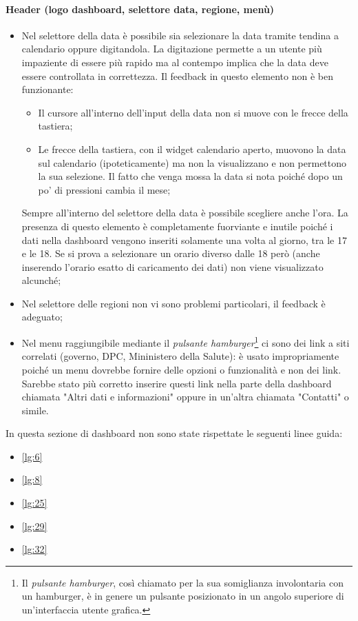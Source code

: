 \paragraph{Header (logo dashboard, selettore data, regione, menù)}
\begin{itemize}
    \item Nel selettore della data è possibile sia selezionare la data tramite tendina a calendario oppure digitandola. La digitazione permette a un utente più impaziente di essere più rapido ma al contempo implica che la data deve essere controllata in correttezza. Il feedback in questo elemento non è ben funzionante:
    \begin{itemize}
        \item Il cursore all'interno dell'input della data non si muove con le frecce della tastiera;
        \item Le frecce della tastiera, con il widget calendario aperto, muovono la data sul calendario (ipoteticamente) ma non la visualizzano e non permettono la sua selezione. Il fatto che venga mossa la data si nota poiché dopo un po' di pressioni cambia il mese;
    \end{itemize}
    Sempre all'interno del selettore della data è possibile scegliere anche l'ora. La presenza di questo elemento è completamente fuorviante e inutile poiché i dati nella dashboard vengono inseriti solamente una volta al giorno, tra le 17 e le 18. Se  si prova a selezionare un orario diverso dalle 18 però (anche inserendo l'orario esatto di caricamento dei dati) non viene visualizzato alcunché;
    \item Nel selettore delle regioni non vi sono problemi particolari, il feedback è adeguato;
    \item Nel menu raggiungibile mediante il \textit{pulsante hamburger}\footnote{Il \textit{pulsante hamburger}, così chiamato per la sua somiglianza involontaria con un hamburger, è in genere un pulsante posizionato in un angolo superiore di un'interfaccia utente grafica. } ci sono dei link a siti correlati (governo, DPC, Mininistero della Salute): è usato impropriamente poiché un menu dovrebbe fornire delle opzioni o funzionalità e non dei link. Sarebbe stato più corretto inserire questi link nella parte della dashboard chiamata "Altri dati e informazioni" oppure in un'altra chiamata "Contatti" o simile.
\end{itemize}
In questa sezione di dashboard non sono state rispettate le seguenti linee guida:
\begin{itemize}
    \item \ref{lg:6}
    \item \ref{lg:8}
    \item \ref{lg:25}
    \item \ref{lg:29}
    \item \ref{lg:32}
\end{itemize}

